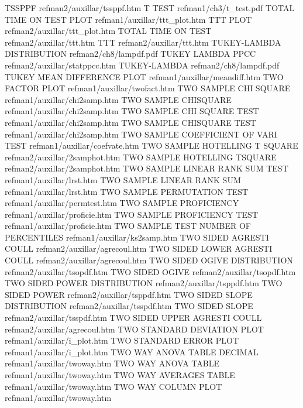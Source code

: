 TSSPPF                                  refman2/auxillar/tssppf.htm
T TEST                                  refman1/ch3/t_test.pdf
TOTAL TIME ON TEST PLOT                 refman1/auxillar/ttt_plot.htm
TTT PLOT                                refman2/auxillar/ttt_plot.htm
TOTAL TIME ON TEST                      refman2/auxillar/ttt.htm
TTT                                     refman2/auxillar/ttt.htm
TUKEY-LAMBDA DISTRIBUTION               refman2/ch8/lampdf.pdf
TUKEY LAMBDA PPCC                       refman2/auxillar/statppcc.htm
TUKEY-LAMBDA                            refman2/ch8/lampdf.pdf
TUKEY MEAN DIFFERENCE PLOT              refman1/auxillar/meandiff.htm
TWO FACTOR PLOT                         refman1/auxillar/twofact.htm
TWO SAMPLE CHI SQUARE                   refman1/auxillar/chi2samp.htm
TWO SAMPLE CHISQUARE                    refman1/auxillar/chi2samp.htm
TWO SAMPLE CHI SQUARE TEST              refman1/auxillar/chi2samp.htm
TWO SAMPLE CHISQUARE TEST               refman1/auxillar/chi2samp.htm
TWO SAMPLE COEFFICIENT OF VARI TEST     refman1/auxillar/coefvate.htm
TWO SAMPLE HOTELLING T SQUARE           refman2/auxillar/2samphot.htm
TWO SAMPLE HOTELLING TSQUARE            refman2/auxillar/2samphot.htm
TWO SAMPLE LINEAR RANK SUM TEST         refman1/auxillar/lrst.htm
TWO SAMPLE LINEAR RANK SUM              refman1/auxillar/lrst.htm
TWO SAMPLE PERMUTATION TEST             refman1/auxillar/permtest.htm
TWO SAMPLE PROFICIENCY                  refman1/auxillar/proficie.htm
TWO SAMPLE PROFICIENCY TEST             refman1/auxillar/proficie.htm
TWO SAMPLE TEST NUMBER OF PERCENTILES   refman1/auxillar/ks2samp.htm
TWO SIDED AGRESTI COULL                 refman2/auxillar/agrecoul.htm
TWO SIDED LOWER AGRESTI COULL           refman2/auxillar/agrecoul.htm
TWO SIDED OGIVE DISTRIBUTION            refman2/auxillar/tsopdf.htm
TWO SIDED OGIVE                         refman2/auxillar/tsopdf.htm
TWO SIDED POWER DISTRIBUTION            refman2/auxillar/tsppdf.htm
TWO SIDED POWER                         refman2/auxillar/tsppdf.htm
TWO SIDED SLOPE DISTRIBUTION            refman2/auxillar/tsspdf.htm
TWO SIDED SLOPE                         refman2/auxillar/tsspdf.htm
TWO SIDED UPPER AGRESTI COULL           refman2/auxillar/agrecoul.htm
TWO STANDARD DEVIATION PLOT             refman1/auxillar/i_plot.htm
TWO STANDARD ERROR PLOT                 refman1/auxillar/i_plot.htm
TWO WAY ANOVA TABLE DECIMAL             refman1/auxillar/twoway.htm
TWO WAY ANOVA TABLE                     refman1/auxillar/twoway.htm
TWO WAY AVERAGES TABLE                  refman1/auxillar/twoway.htm
TWO WAY COLUMN PLOT                     refman1/auxillar/twoway.htm
